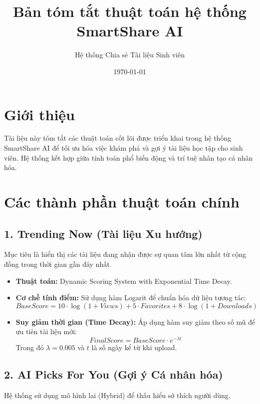 \documentclass{article}
\title{Bản tóm tắt thuật toán hệ thống SmartShare AI}
\author{Hệ thống Chia sẻ Tài liệu Sinh viên}
\date{\today}
\begin{document}
\maketitle

\section{Giới thiệu}
Tài liệu này tóm tắt các thuật toán cốt lõi được triển khai trong hệ thống SmartShare AI để tối ưu hóa việc khám phá và gợi ý tài liệu học tập cho sinh viên. Hệ thống kết hợp giữa tính toán phổ biến động và trí tuệ nhân tạo cá nhân hóa.

\section{Các thành phần thuật toán chính}

\subsection{1. Trending Now (Tài liệu Xu hướng)}
Mục tiêu là hiển thị các tài liệu đang nhận được sự quan tâm lớn nhất từ cộng đồng trong thời gian gần đây nhất.

\begin{itemize}
    \item \textbf{Thuật toán:} Dynamic Scoring System with Exponential Time Decay.
    \item \textbf{Cơ chế tính điểm:} Sử dụng hàm Logarit để chuẩn hóa dữ liệu tương tác:
    \begin{equation}
        BaseScore = 10 \cdot \log(1 + Views) + 5 \cdot Favorites + 8 \cdot \log(1 + Downloads)
    \end{equation}
    \item \textbf{Suy giảm thời gian (Time Decay):} Áp dụng hàm suy giảm theo số mũ để ưu tiên tài liệu mới:
    \begin{equation}
        FinalScore = BaseScore \cdot e^{-\lambda t}
    \end{equation}
    Trong đó $\lambda = 0.005$ và $t$ là số ngày kể từ khi upload.
\end{itemize}

\subsection{2. AI Picks For You (Gợi ý Cá nhân hóa)}
Hệ thống sử dụng mô hình lai (Hybrid) để thấu hiểu sở thích người dùng.
\end{document}
